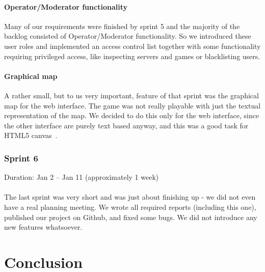 \documentclass[11pt,a4paper]{report}
\begin{document}
\subsubsection{Operator/Moderator functionality}
Many of our requirements were finished by sprint 5 and the majority of the
backlog consisted of Operator/Moderator functionality. So we introduced these
user roles and implemented an access control list together with some
functionality requiring privileged access, like inspecting servers and games or
blacklisting users.

\subsubsection{Graphical map}
A rather small, but to us very important, feature of that sprint was the
graphical map for the web interface. The game was not really playable with just
the textual representation of the map. We decided to do this only for the web
interface, since the other interface are purely text based anyway, and this was
a good task for HTML5 canvas~\cite{html5_canvas}.
\subsection*{Sprint 6}
Duration: Jan 2 -- Jan 11 (approximately 1 week)\\\\
The last sprint was very short and was just about finishing up - we did not even
have a real planning meeting. We wrote all required reports (including this
one), published our project on Github, and fixed some bugs. We did not
introduce any new features whatsoever.

\chapter{Conclusion}
\end{document}
